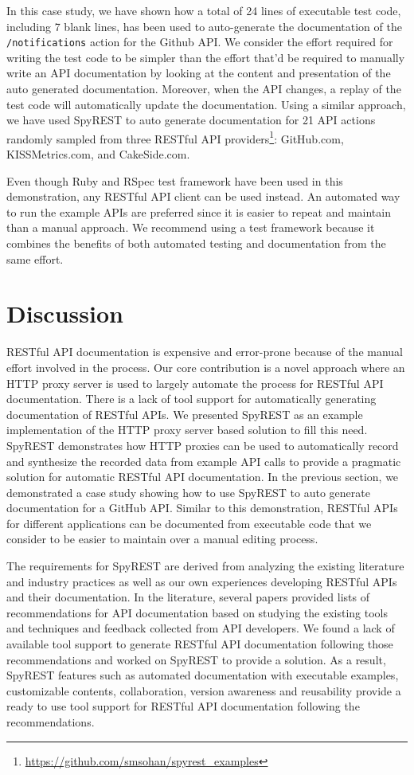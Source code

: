 \documentclass[conference]{IEEEtran}
\begin{document}
In this case study, we have shown how a total of 24 lines of executable test code, including 7 blank lines, has been used to auto-generate the documentation of the \texttt{/notifications} action for the Github API. We consider the effort required for writing the test code to be simpler than the effort that'd be required to manually write an API documentation by looking at the content and presentation of the auto generated documentation. Moreover, when the API changes, a replay of the test code will automatically update the documentation. Using a similar approach, we have used SpyREST to auto generate documentation for 21 API actions randomly sampled from three RESTful API providers\footnote{\url{https://github.com/smsohan/spyrest_examples}}: GitHub.com, KISSMetrics.com, and CakeSide.com.

Even though Ruby and RSpec test framework have been used in this demonstration, any RESTful API client can be used instead. An automated way to run the example APIs are preferred since it is easier to repeat and maintain than a manual approach. We recommend using a test framework because it combines the benefits of both automated testing and documentation from the same effort.

\section{Discussion}
RESTful API documentation is expensive and error-prone because of the manual effort involved in the process. Our core contribution is a novel approach where an HTTP proxy server is used to largely automate the process for RESTful API documentation. There is a lack of tool support for automatically generating documentation of RESTful APIs. We presented SpyREST as an example implementation of the HTTP proxy server based solution to fill this need. SpyREST demonstrates how HTTP proxies can be used to automatically record and synthesize the recorded data from example API calls to provide a pragmatic solution for automatic RESTful API documentation. In the previous section, we demonstrated a case study showing how to use SpyREST to auto generate documentation for a GitHub API. Similar to this demonstration, RESTful APIs for different applications can be documented from executable code that we consider to be easier to maintain over a manual editing process.

The requirements for SpyREST are derived from analyzing the existing literature and industry practices as well as our own experiences developing RESTful APIs and their documentation. In the literature, several papers provided lists of recommendations for API documentation based on studying the existing tools and techniques and feedback collected from API developers. We found a lack of available tool support to generate RESTful API documentation following those recommendations and worked on SpyREST to provide a solution. As a result, SpyREST features such as automated documentation with executable examples, customizable contents, collaboration, version awareness and reusability provide a ready to use tool support for RESTful API documentation following the recommendations.
\end{document}
